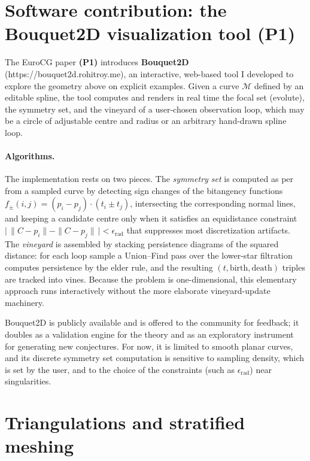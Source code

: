 \documentclass[10pt]{article}
\newcommand{\M}{\mathcal{M}}
\begin{document}
\section{Software contribution: the Bouquet2D visualization tool (P1)}

The EuroCG paper \textbf{(P1)} introduces \textbf{Bouquet2D} (https://bouquet2d.rohitroy.me), an interactive, web-based tool I developed to explore the geometry above on explicit examples. Given a curve $\M$ defined by an editable spline, the tool computes and renders in real time the focal set (evolute), the symmetry set, and the vineyard of a user-chosen observation loop, which may be a circle of adjustable centre and radius or an arbitrary hand-drawn spline loop.

\paragraph{Algorithms.}
The implementation rests on two pieces. The \emph{symmetry set} is computed as per \cite{bruce1985symmetry} from a sampled curve by detecting sign changes of the bitangency functions $f_\pm(i,j) = (p_i - p_j)\cdot(t_i \pm t_j)$, intersecting the corresponding normal lines, and keeping a candidate centre only when it satisfies an equidistance constraint $\bigl|\,\|C-p_i\|-\|C-p_j\|\,\bigr| < \epsilon_{\mathrm{rad}}$ that suppresses most discretization artifacts. The \emph{vineyard} is assembled by stacking persistence diagrams of the squared distance: for each loop sample a Union--Find pass over the lower-star filtration computes persistence by the elder rule, and the resulting $(t,\text{birth},\text{death})$ triples are tracked into vines. Because the problem is one-dimensional, this elementary approach runs interactively without the more elaborate vineyard-update machinery.

Bouquet2D is publicly available and is offered to the community for feedback; it doubles as a validation engine for the theory and as an exploratory instrument for generating new conjectures. For now, it is limited to smooth planar curves, and its discrete symmetry set computation is sensitive to sampling density, which is set by the user, and to the choice of the constraints (such as $\epsilon_{\mathrm{rad}}$) near singularities.

\section{Triangulations and stratified meshing}
\end{document}
